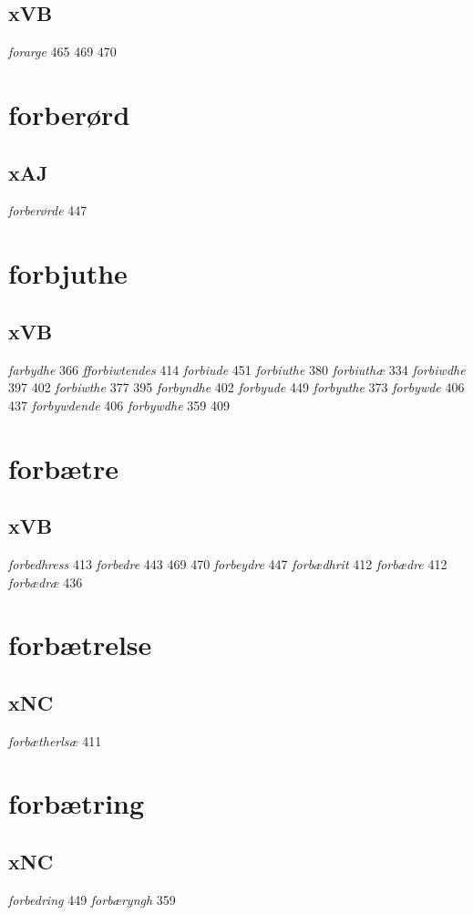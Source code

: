 \documentclass[a4paper,twocolumn]{article}
\begin{document}
\subsection{xVB}
\label{sec:orgb98cd48}
\emph{forarge} 465 469 470 
\section{forberørd}
\label{sec:orge299221}
\subsection{xAJ}
\label{sec:org77674d1}
\emph{forberørde} 447 
\section{forbjuthe}
\label{sec:org2d09efc}
\subsection{xVB}
\label{sec:org9a6ffa4}
\emph{farbydhe} 366 \emph{fforbiwtendes} 414 \emph{forbiude} 451 \emph{forbiuthe} 380 \emph{forbiuthæ} 334 \emph{forbiwdhe} 397 402 \emph{forbiwthe} 377 395 \emph{forbyndhe} 402 \emph{forbyude} 449 \emph{forbyuthe} 373 \emph{forbywde} 406 437 \emph{forbywdende} 406 \emph{forbywdhe} 359 409 
\section{forbætre}
\label{sec:orgfd05185}
\subsection{xVB}
\label{sec:org37a3eee}
\emph{forbedhress} 413 \emph{forbedre} 443 469 470 \emph{forbeydre} 447 \emph{forbædhrit} 412 \emph{forbædre} 412 \emph{forbædræ} 436 
\section{forbætrelse}
\label{sec:org8190930}
\subsection{xNC}
\label{sec:org60b6f75}
\emph{forbætherlsæ} 411 
\section{forbætring}
\label{sec:org810d315}
\subsection{xNC}
\label{sec:org1a7636f}
\emph{forbedring} 449 \emph{forbæryngh} 359 
\end{document}
